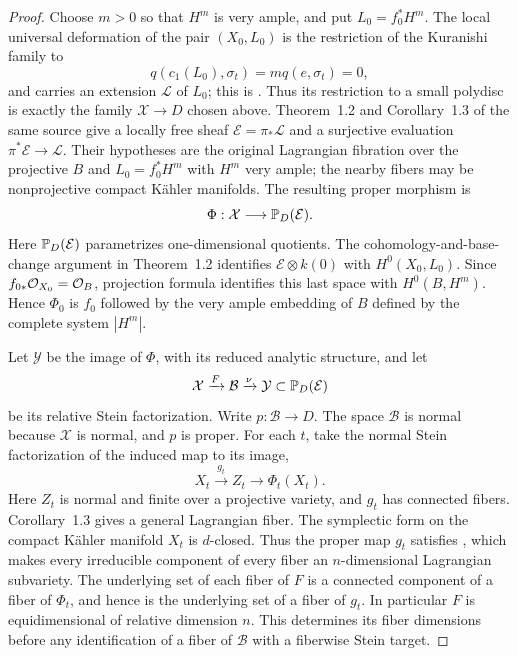 \begin{proof}
Choose $m>0$ so that $H^m$ is very ample, and put
$L_0=f_0^*H^m$.  The local universal deformation of the pair
$(X_0,L_0)$ is the restriction of the Kuranishi family to
\[
                   q(c_1(L_0),\sigma_t)=m q(e,\sigma_t)=0,
\]
and carries an extension $\mathcal L$ of $L_0$; this is
\cite[Theorem~1.1]{MatsushitaDeformations2016}.  Thus its restriction
to a small polydisc is exactly the family $\mathcal X\to D$ chosen
above.  Theorem~1.2 and Corollary~1.3 of the same source give a locally
free sheaf $\mathcal E=\pi_*\mathcal L$ and a surjective evaluation
$\pi^*\mathcal E\to\mathcal L$.  Their hypotheses are the original
Lagrangian fibration over the projective $B$ and
$L_0=f_0^*H^m$ with $H^m$ very ample; the nearby fibers may be nonprojective compact
K\"ahler manifolds.  The resulting proper morphism is
\[
                  \Phi:\mathcal X\longrightarrow\mathbb P_D(\mathcal E).
\]
Here $\mathbb P_D(\mathcal E)$ parametrizes one-dimensional quotients.
The cohomology-and-base-change argument in Theorem~1.2 identifies
$\mathcal E\otimes k(0)$ with $H^0(X_0,L_0)$.  Since
$f_{0*}\mathcal O_{X_0}=\mathcal O_B$, projection formula identifies this last
space with $H^0(B,H^m)$.  Hence $\Phi_0$ is $f_0$ followed by the
very ample embedding of $B$ defined by the complete system $|H^m|$.

Let $\mathcal Y$ be the image of $\Phi$, with its reduced analytic
structure, and let
\[
 \mathcal X\xrightarrow{F}\mathcal B\xrightarrow{\nu}
             \mathcal Y\subset\mathbb P_D(\mathcal E)
\]
be its relative Stein factorization.  Write $p:\mathcal B\to D$.
The space $\mathcal B$ is normal because $\mathcal X$ is normal,
and $p$ is proper.  For each $t$, take the normal Stein factorization
of the induced map to its image,
\[
              X_t\xrightarrow{g_t}Z_t
                    \longrightarrow\Phi_t(X_t).
\]
Here $Z_t$ is normal and finite over a projective variety, and $g_t$
has connected fibers.  Corollary~1.3 gives a general Lagrangian fiber.
The symplectic form on the compact K\"ahler manifold $X_t$ is
$d$-closed.  Thus the proper map $g_t$ satisfies
\cite[Theorem~1]{Matsushita2000}, which makes every irreducible
component of every fiber an $n$-dimensional Lagrangian subvariety.
The underlying set of each fiber of $F$ is a connected component
of a fiber of $\Phi_t$, and hence is the underlying set of a fiber
of $g_t$.  In particular $F$ is equidimensional of relative
dimension $n$.  This determines
its fiber dimensions before any identification of a fiber of
$\mathcal B$ with a fiberwise Stein target.


\end{proof}
